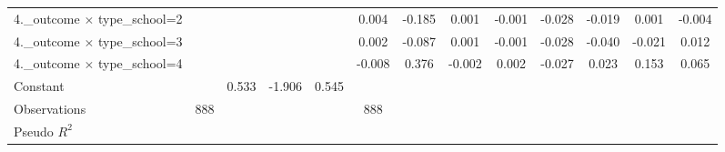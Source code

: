 {\begin{tabular}{l*{12}{c}}
4.\_outcome $\times$ type\_school=2&                     &                     &                     &                     &       0.004\sym{**} &      -0.185\sym{*}  &       0.001\sym{***}&      -0.001\sym{***}&      -0.028\sym{***}&      -0.019         &       0.001         &      -0.004         \\
4.\_outcome $\times$ type\_school=3&                     &                     &                     &                     &       0.002\sym{**} &      -0.087\sym{*}  &       0.001\sym{***}&      -0.001\sym{***}&      -0.028\sym{***}&      -0.040\sym{***}&      -0.021         &       0.012         \\
4.\_outcome $\times$ type\_school=4&                     &                     &                     &                     &      -0.008\sym{**} &       0.376\sym{*}  &      -0.002\sym{***}&       0.002\sym{***}&      -0.027\sym{***}&       0.023         &       0.153\sym{**} &       0.065         \\
Constant            &                     &       0.533         &      -1.906\sym{*}  &       0.545         &                     &                     &                     &                     &                     &                     &                     &                     \\
\midrule
Observations        &         888         &                     &                     &                     &         888         &                     &                     &                     &                     &                     &                     &                     \\
Pseudo \(R^{2}\)    &                     &                     &                     &                     &                     &                     &                     &                     &                     &                     &                     &                     \\
\bottomrule
\end{tabular}
}
